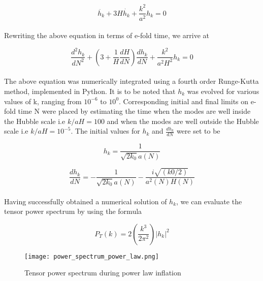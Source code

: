 \documentclass[12pt,a4paper,oneside]{book}
\begin{document}
\begin{equation}
\ddot{h_k} + 3H\dot{h_k} + \frac{k^2}{a^2}h_k = 0
\end{equation}

\paragraph*{} Rewriting the above equation in terms of e-fold time, we arrive at

\begin{equation}
\frac{d^2h_k}{dN^2} + (3+\frac{1}{H}\frac{dH}{dN})\frac{dh_k}{dN} + \frac{k^2}{a^2H^2}h_k = 0
\end{equation}

\paragraph*{} The above equation was numerically integrated using a fourth order Runge-Kutta method, implemented in Python. It is to be noted that $h_k$ was evolved for various values of k, ranging from $10^{-6}$ to $10^{0}$. Corresponding initial and final limits on e-fold time N were placed by estimating the time when the modes are well inside the Hubble scale i.e $k/aH =  100$ and when the modes are well outside the Hubble scale i.e $k/aH =  10^{-5}$. The initial values for $h_k$ and $\frac{dh_k}{dN}$ were set to be

\begin{equation}
h_k  = \frac{1}{\sqrt{2k_0}a(N)}
\end{equation}

\begin{equation}
\frac{dh_k}{dN} = -\frac{1}{\sqrt{2k_0}a(N)} - \frac{i\sqrt{(k0/2)}}{a^2(N)H(N)}
\end{equation}

\paragraph*{} Having successfully obtained a numerical solution of $h_k$, we can evaluate the tensor power spectrum by using the formula

\begin{equation}
P_T(k) = 2 (\frac{k^3}{2\pi^2}) |h_k|^2
\end{equation}

\begin{figure}
\begin{center}
\texttt{[image: power\_spectrum\_power\_law.png]}
\caption[Tensor power spectrum during power law inflation]{Tensor power spectrum during power law inflation}
\label{blah}
\end{center}
\end{figure}
\end{document}

